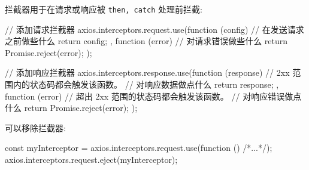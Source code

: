 拦截器用于在请求或响应被 \texttt{then, catch} 处理前拦截:

\begin{JavaScript}
// 添加请求拦截器
axios.interceptors.request.use(function (config) {
  // 在发送请求之前做些什么
  return config;
}, function (error) {
  // 对请求错误做些什么
  return Promise.reject(error);
});

// 添加响应拦截器
axios.interceptors.response.use(function (response) {
  // 2xx 范围内的状态码都会触发该函数。
  // 对响应数据做点什么
  return response;
}, function (error) {
  // 超出 2xx 范围的状态码都会触发该函数。
  // 对响应错误做点什么
  return Promise.reject(error);
});
\end{JavaScript}

可以移除拦截器:

\begin{JavaScript}
const myInterceptor = axios.interceptors.request.use(function () {/*...*/});
axios.interceptors.request.eject(myInterceptor);
\end{JavaScript}


\newpage